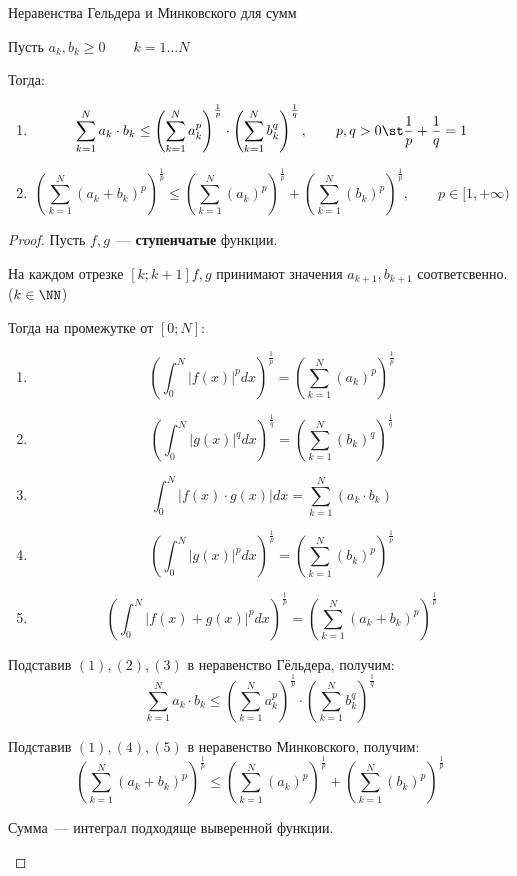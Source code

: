 \begin{Proposition}{Неравенства Гельдера и Минковского для сумм}{}
    
    Пусть $a_k, b_k \ge 0 \qquad k = 1 \ldots N$

    Тогда:

    \begin{enumerate}
        \item \[
            \sum^N_{k=1}a_k \cdot b_k \le \left(\sum^N_{k=1}a^p_k\right)^{\frac{1}{p}}\cdot \left(\sum^N_{k=1}b^q_k \right)^{\frac{1}{q}}, \qquad p, q > 0 \st \frac{1}{p} + \frac{1}{q} = 1
            \]
        \item \[
            \left(\sum^N_{k=1}(a_k + b_k)^p \right)^\frac{1}{p} \le \left(\sum^N_{k=1}(a_k)^p\right)^{\frac{1}{p}} + \left(\sum^N_{k=1}(b_k)^p\right)^{\frac{1}{p}}, \qquad p \in [1, +\infty)
            \]
    \end{enumerate}
    
\end{Proposition}

\begin{proof}

    Пусть $f, g$~--- \textbf{ступенчатые} функции. 

    На каждом отрезке $[k; k+1] f, g$ принимают значения $a_{k+1}, b_{k+1}$ соответсвенно. ($k \in \NN$)

    Тогда на промежутке от $[0; N]$:
    
    \begin{enumerate}
    \item \[
    \left(\int_0^N |f(x)|^p dx \right)^\frac{1}{p} = \left(\sum^N_{k=1}(a_k)^p\right)^{\frac{1}{p}}
    \]
    \item \[
    \left(\int_0^N |g(x)|^q dx \right)^\frac{1}{q} = \left(\sum^N_{k=1}(b_k)^q\right)^{\frac{1}{q}}
    \]
    \item \[
    \int_0^N |f(x) \cdot g(x)| dx = \sum^N_{k=1}(a_k \cdot b_k)
    \]
    \item \[
    \left(\int_0^N |g(x)|^p dx \right)^\frac{1}{p} = \left(\sum^N_{k=1}(b_k)^p\right)^{\frac{1}{p}}
    \]
    \item \[
    \left(\int_0^N |f(x) + g(x)|^p dx \right)^\frac{1}{p} = \left(\sum^N_{k=1}(a_k + b_k)^p \right)^\frac{1}{p}
    \]
    \end{enumerate}
    

    Подставив $(1), (2), (3)$ в неравенство Гёльдера, получим:
    \[
    \sum^N_{k=1}a_k \cdot b_k \le \left(\sum^N_{k=1}a^p_k\right)^{\frac{1}{p}}\cdot \left(\sum^N_{k=1}b^q_k \right)^{\frac{1}{q}}
    \]

    Подставив $(1), (4), (5)$ в неравенство Минковского, получим:
    \[
    \left(\sum^N_{k=1}(a_k + b_k)^p \right)^\frac{1}{p} \le \left(\sum^N_{k=1}(a_k)^p\right)^{\frac{1}{p}} + \left(\sum^N_{k=1}(b_k)^p\right)^{\frac{1}{p}}
    \]

    \begin{remark}
        Сумма~--- интеграл подходяще выверенной функции.
    \end{remark}
\end{proof}

